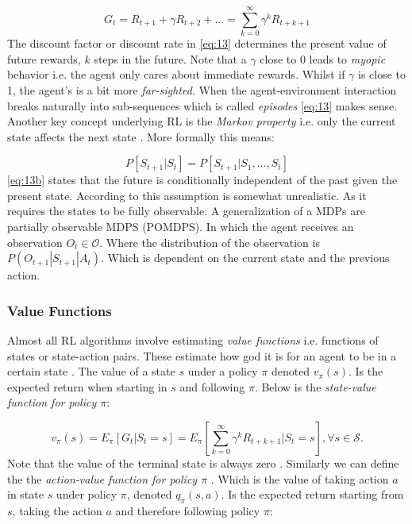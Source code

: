 \documentclass{kththesis}
\theoremstyle{definition}
\begin{document}
\begin{equation}
    \label{eq:13}
    G_t = R_{t+1} + \gamma R_{t+2} + ... = \sum_{k=0}^{\infty}{\gamma^{k}R_{t+k+1}}
\end{equation}
The discount factor or discount rate in \autoref{eq:13} determines the present value of future rewards, $k$ steps in the future. Note that a $\gamma$ close to 0 leads to \textit{myopic} behavior i.e. the agent only cares about immediate rewards. Whilst if $\gamma$ is close to 1, the agent's is a bit more \textit{far-sighted}. When the agent-environment interaction breaks naturally into sub-sequences which is called \textit{episodes}
\autoref{eq:13} makes sense.  Another key concept underlying RL is the \textit{Markov property} i.e. only the current state affects the next state \parencite{arulkumaran2017brief}. More formally this means:

\begin{equation}
    \label{eq:13b}
    P[S_{t+1} | S_t] = P[S_{t+1} | S_1, ..., S_t]
\end{equation}
\autoref{eq:13b} states that the future is conditionally independent of the past given the present state. According to \textcite{arulkumaran2017brief} this assumption is somewhat unrealistic. As it requires the states to be fully observable. A generalization of a MDPs are partially observable MDPS (POMDPS). In which the agent receives an observation $O_t \in \mathcal{O}$. Where the distribution of the observation is $P(O_{t+1} | S_{t+1} | A_t)$\parencite{arulkumaran2017brief}. Which is dependent on the current state and the previous action.

\subsubsection*{Value Functions}

Almost all RL algorithms involve estimating \textit{value functions} i.e. functions of states or state-action pairs. These estimate how god it is for an agent to be in a certain state \parencite{sutton1998reinforcement, li2017deep}. The value of a state $s$ under a policy $\pi$ denoted $v_{\pi}(s)$. Is the expected return when starting in $s$ and following $\pi$. Below is the \textit{state-value function for policy $\pi$}:

\begin{equation}
    \label{eq:14}
    v_{\pi}(s) = E_{\pi}[G_t | S_t = s] = E_{\pi}\left[\sum_{k=0}^{\infty}{\gamma^{k}R_{t+k+1}} | S_t = s\right], \forall s \in \mathcal{S}.
\end{equation}
Note that the value of the terminal state is always zero \parencite{sutton1998reinforcement}. Similarly  we can define the the \textit{action-value function for policy $\pi$} \parencite{sutton1998reinforcement}. Which is the value of taking action $a$ in state $s$ under policy $\pi$, denoted $q_{\pi}(s,a)$. Is the expected return starting from $s$, taking the action $a$ and therefore following policy $\pi$:
\end{document}
